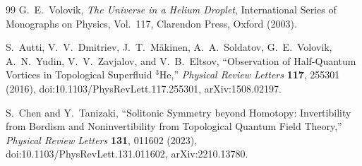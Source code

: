 \documentclass[11pt]{article}
\theoremstyle{definition}
\theoremstyle{plain}
\theoremstyle{remark}
\begin{document}
\begin{thebibliography}{99}
            G.~E.~Volovik,
            \newblock \textit{The Universe in a Helium Droplet},
            \newblock International Series of Monographs on Physics, Vol.~117,
            \newblock Clarendon Press, Oxford (2003).

            S.~Autti, V.~V.~Dmitriev, J.~T.~M\"akinen, A.~A.~Soldatov,
            G.~E.~Volovik, A.~N.~Yudin, V.~V.~Zavjalov, and V.~B.~Eltsov,
            \newblock ``Observation of Half-Quantum Vortices in Topological Superfluid $^3$He,''
            \newblock \textit{Physical Review Letters} \textbf{117}, 255301 (2016),
            \newblock doi:10.1103/PhysRevLett.117.255301,
            \newblock arXiv:1508.02197.

            S.~Chen and Y.~Tanizaki,
            \newblock ``Solitonic Symmetry beyond Homotopy:
            Invertibility from Bordism and Noninvertibility from Topological Quantum Field Theory,''
            \newblock \textit{Physical Review Letters} \textbf{131}, 011602 (2023),
            \newblock doi:10.1103/PhysRevLett.131.011602,
            \newblock arXiv:2210.13780.

        \end{thebibliography}
\end{document}
